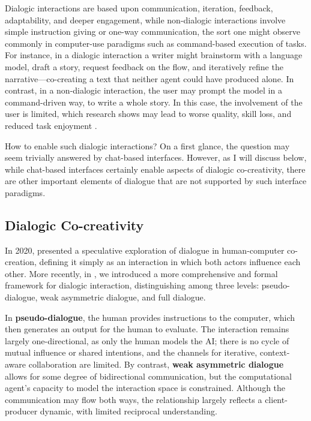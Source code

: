 Dialogic interactions are based upon communication, iteration, feedback, adaptability, and deeper engagement, while non-dialogic interactions involve simple instruction giving or one-way communication, the sort one might observe commonly in computer-use paradigms such as command-based execution of tasks. For instance, in a dialogic interaction a writer might brainstorm with a language model, draft a story, request feedback on the flow, and iteratively refine the narrative—co-creating a text that neither agent could have produced alone. In contrast, in a non-dialogic interaction, the user may prompt the model in a command-driven way, to write a whole story. In this case, the involvement of the user is limited, which research shows may lead to worse quality, skill loss, and reduced task enjoyment \cite{Abbas2024-sf, Heersmink2024-mk, DellAcqua2023-og}. 

How to enable such dialogic interactions? On a first glance, the question may seem trivially answered by chat-based interfaces. However, as I will discuss below, while chat-based interfaces certainly enable aspects of dialogic co-creativity, there are other important elements of dialogue that are not supported by such interface paradigms.

\subsection{Dialogic Co-creativity}

In 2020, \cite{Bown2020-zn} presented a speculative exploration of dialogue in human-computer co-creation, defining it simply as an interaction in which both actors influence each other. More recently, in \cite{Bown2024-yx}, we introduced a more comprehensive and formal framework for dialogic interaction, distinguishing among three levels: pseudo-dialogue, weak asymmetric dialogue, and full dialogue.

In \textbf{pseudo-dialogue}, the human provides instructions to the computer, which then generates an output for the human to evaluate. The interaction remains largely one-directional, as only the human models the AI; there is no cycle of mutual influence or shared intentions, and the channels for iterative, context-aware collaboration are limited. By contrast, \textbf{weak asymmetric dialogue} allows for some degree of bidirectional communication, but the computational agent’s capacity to model the interaction space is constrained. Although the communication may flow both ways, the relationship largely reflects a client-producer dynamic, with limited reciprocal understanding.

